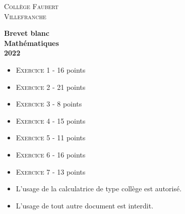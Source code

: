 

\usepackage{tabularx}



\begin{titlepage}

  \center %

  \textsc{\LARGE Collège Faubert}\\[2cm] %
  \textsc{\large Villefranche}\\[2cm] %
 
 \horrule{2px}

 \vspace{1cm}

 { \Huge \bfseries Brevet blanc}\\[2cm] %
 { \Huge \bfseries Mathématiques}\\[2cm] %
 {\large \bfseries 2022}\\[2cm] 

 \horrule{2px}

\begin{itemize}
    \item \textsc{Exercice 1} - 16 points     
    \item \textsc{Exercice 2} - 21 points 
    \item \textsc{Exercice 3} -  8 points 
    \item \textsc{Exercice 4} - 15 points 
    \item \textsc{Exercice 5} - 11 points 
    \item \textsc{Exercice 6} - 16 points 
    \item \textsc{Exercice 7} - 13 points 
\end{itemize}

\vspace{2cm}

\begin{itemize}
    \item L'usage de la calculatrice de type collège est autorisé.
    \item L'usage de tout autre document est interdit. 
\end{itemize}

\vfill 

\end{titlepage}

